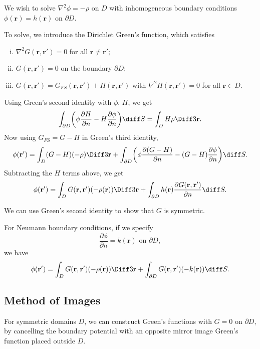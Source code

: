 \documentclass[12pt]{article}
\begin{document}
We wish to solve $\nabla^2 \phi = - \rho$ on $D$ with inhomogeneous boundary conditions $\phi(\mathbf{r}) = h(\mathbf{r})$ on $\partial D$.

To solve, we introduce the Dirichlet Green's function, which satisfies
\begin{enumerate}[(i)]
	\item $\nabla^2 G(\mathbf{r}, \mathbf{r}') = 0$ for all $\mathbf{r} \neq \mathbf{r}'$;
	\item $G(\mathbf{r}, \mathbf{r}') = 0$ on the boundary $\partial D$;
	\item $G(\mathbf{r}, \mathbf{r}') = G_{FS}(\mathbf{r},\mathbf{r}') + H(\mathbf{r},\mathbf{r}')$ with $\nabla^2 H(\mathbf{r}, \mathbf{r}') = 0$ for all $\mathbf{r} \in D$.
\end{enumerate}

Using Green's second identity with $\phi$, $H$, we get
\[
	\int_{\partial D}\biggl( \phi \frac{\partial H}{\partial n} - H \frac{\partial \phi}{\partial n} \biggr) \diff S = \int_{D} H \rho \Diff3 \mathbf{r}
.\]
Now using $G_{FS} = G - H$ in Green's third identity,
\[
	\phi(\mathbf{r}') = \int_{D}(G - H)(-\rho)\Diff3 \mathbf{r} + \int_{\partial D} \biggl( \phi \frac{\partial(G - H)}{\partial n} - (G - H) \frac{\partial \phi}{\partial n}\biggr) \diff S
.\]
Subtracting the $H$ terms above, we get
\[
	\phi(\mathbf{r}') = \int_{D}G(\mathbf{r}, \mathbf{r}')(-\rho(\mathbf{r}))\Diff3 \mathbf{r} + \int_{\partial D}h(\mathbf{r}) \frac{\partial G(\mathbf{r}, \mathbf{r}')}{\partial n}\diff S
.\]

We can use Green's second identity to show that $G$ is symmetric.

For Neumann boundary conditions, if we specify
\[
	\frac{\partial \phi}{\partial n} = k(\mathbf{r}) \text{ on } \partial D
,\]
we have
\[
	\phi(\mathbf{r}') = \int_{D}G(\mathbf{r},\mathbf{r}')(-\rho(\mathbf{r})) \Diff3 \mathbf{r} + \int_{\partial D}G(\mathbf{r}, \mathbf{r}')(-k(\mathbf{r})) \diff S
.\]

\subsection{Method of Images}%
\label{sub:method_of_images}

For symmetric domains $D$, we can construct Green's functions with $G = 0$ on $\partial D$, by cancelling the boundary potential with an opposite mirror image Green's function placed outside $D$.
\end{document}
